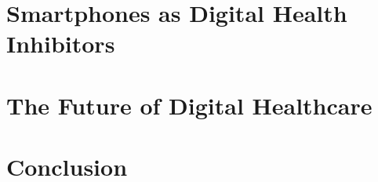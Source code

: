 \documentclass[xcolor=dvipsnames, aspectratio=1610]{beamer}
\begin{document}
\section{Smartphones as Digital Health Inhibitors}%
\label{sec:smartphones_as_digital_health_inhibitors}

\section{The Future of Digital Healthcare}%
\label{sec:the_future_of_digital_healthcare}

\section{Conclusion}%
\label{sec:conclusion}

\end{document}
